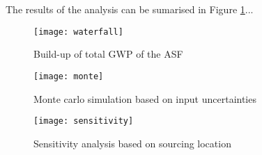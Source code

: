 
The results of the analysis can be sumarised in Figure \ref{fig:waterfall}...


\begin{figure}[H]
\begin{center}
\texttt{[image: waterfall]}
\caption{Build-up of total GWP of the ASF}
\label{fig:waterfall}
\end{center}
\end{figure}

\begin{figure}[H]
\begin{center}
\texttt{[image: monte]}
\caption{Monte carlo simulation based on input uncertainties}
\label{fig:monte}
\end{center}
\end{figure}

\begin{figure}[H]
\begin{center}
\texttt{[image: sensitivity]}
\caption{Sensitivity analysis based on sourcing location}
\label{fig:sensitivity}
\end{center}
\end{figure}
